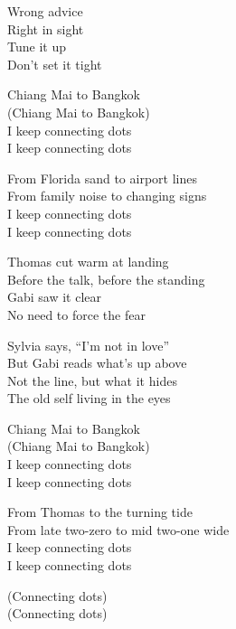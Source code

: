 \begin{lyrics}
Wrong advice\\
Right in sight\\
Tune it up\\
Don’t set it tight

Chiang Mai to Bangkok\\
(Chiang Mai to Bangkok)\\
I keep connecting dots\\
I keep connecting dots

From Florida sand to airport lines\\
From family noise to changing signs\\
I keep connecting dots\\
I keep connecting dots

Thomas cut warm at landing\\
Before the talk, before the standing\\
Gabi saw it clear\\
No need to force the fear

Sylvia says, “I’m not in love”\\
But Gabi reads what’s up above\\
Not the line, but what it hides\\
The old self living in the eyes

Chiang Mai to Bangkok\\
(Chiang Mai to Bangkok)\\
I keep connecting dots\\
I keep connecting dots

From Thomas to the turning tide\\
From late two-zero to mid two-one wide\\
I keep connecting dots\\
I keep connecting dots

(Connecting dots)\\
(Connecting dots)

\end{lyrics}

